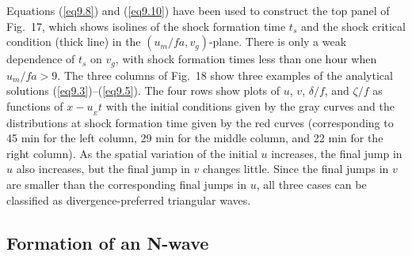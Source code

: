 \documentclass[10pt]{article}
\begin{document}
     Equations (\ref{eq9.8}) and (\ref{eq9.10}) have been used to construct
the top panel of Fig.~17, which shows isolines of the shock formation time
$t_s$ and the shock critical condition (thick line) in the $(u_m/fa,v_g)$-plane.
There is only a weak dependence of $t_s$ on $v_g$, with shock formation times
less than one hour when $u_m/fa > 9$. The three columns of Fig.~18 show three
examples of the analytical solutions (\ref{eq9.3})--(\ref{eq9.5}). The
four rows show plots of $u$, $v$, $\delta/f$, and $\zeta/f$ as functions of
$x-u_{_E} t$ with the initial conditions given by the gray curves and
the distributions at shock formation time given by the red curves (corresponding
to 45 min for the left column, 29 min for the middle column, and 22 min for
the right column). As the spatial variation of the initial $u$ increases, the
final jump in $u$ also increases, but the final jump in $v$ changes little.
Since the final jumps in $v$ are smaller than the corresponding final jumps
in $u$, all three cases can be classified as divergence-preferred triangular
waves.




\subsection{Formation of an N-wave}
\end{document}
